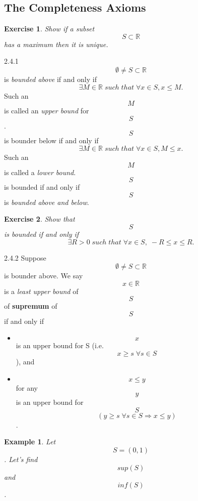 \documentclass[a4paper]{article}
\def\rr{{\mathbb R}}
\newtheorem{exercise}{Exercise}[subsection]
\newtheorem{example}{Example}[subsection]
\begin{document}
\subsection{The Completeness Axioms}
\begin{exercise}
    Show if a subset $$S \subset \rr $$ has a maximum then it is unique.  
\end{exercise}
\begin{definition}{2.4.1}{}
    $$\emptyset \neq S \subset \mathbb{R}$$ is \emph{bounded above} if and only if \\
    \begin{equation*}
     \exists M \in \mathbb{R} \; such \; that\; \forall x \in S, x \leq M.
    \end{equation*}
    Such an $$M$$ is called an \emph{upper bound} for $$S$$.\\
    $$S$$ is bounder below if and only if 
    \begin{equation*} 
        \exists M \in \mathbb{R} \; such \; that \; \forall x\in S,M\leq x.
    \end{equation*}
    Such an $$M$$ is called a \emph{lower bound}.\\
   $$S$$ is bounded if and only if $$S$$ is \emph{bounded above and below}.
\end{definition}
\begin{exercise}
    Show that $$S$$ is bounded if and only if 
    \begin{equation*}
        \exists R>0 \; such \; that \; \forall x \in S, \; -R\leq x \leq R.
    \end{equation*}
\end{exercise}  
\begin{definition}{2.4.2}{}
    Suppose $$\emptyset \neq S \subset \mathbb{R}$$ is bounder above. We say $$x\in \mathbb{R}$$ is a \emph{least upper bound} of $$S$$ of \textbf{supremum} of $$S$$ if and only if 
    \begin{itemize}
        \item $$x$$ is an upper bound for S (i.e. $$x\geq s \; \forall s \in S$$), and
        \item $$x\leq y$$ for any $$y$$ is an upper bound for $$S$$ $$(y\geq s \; \forall s\in S \Longrightarrow   x\leq y)$$.
    \end{itemize}
\end{definition}
\begin{example}
    Let $$S=(0,1)$$. Let's find $$sup(S)$$ and $$inf(S)$$.\\
\end{example}
\end{document}
